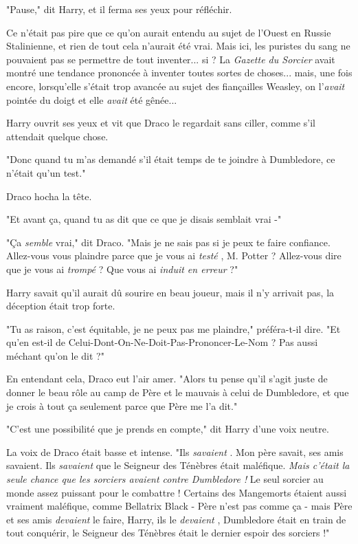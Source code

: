 "Pause," dit Harry, et il ferma ses yeux pour réfléchir.

Ce n'était pas pire que ce qu'on aurait entendu au sujet de l'Ouest en Russie Stalinienne, et rien de tout cela n'aurait été vrai. Mais ici, les puristes du sang ne pouvaient pas se permettre de tout inventer... si ? La \emph{Gazette du Sorcier}  avait montré une tendance prononcée à inventer toutes sortes de choses... mais, une fois encore, lorsqu'elle s'était trop avancée au sujet des fiançailles Weasley, on l'\emph{avait}  pointée du doigt et elle \emph{avait}  été gênée...

Harry ouvrit ses yeux et vit que Draco le regardait sans ciller, comme s'il attendait quelque chose.

"Donc quand tu m'as demandé s'il était temps de te joindre à Dumbledore, ce n'était qu'un test."

Draco hocha la tête.

"Et avant ça, quand tu as dit que ce que je disais semblait vrai -"

"Ça \emph{semble } vrai," dit Draco. "Mais je ne sais pas si je peux te faire confiance. Allez-vous vous plaindre parce que je vous ai \emph{testé} , M. Potter ? Allez-vous dire que je vous ai \emph{trompé}  ? Que vous ai \emph{induit en erreur } ?"

Harry savait qu'il aurait dû sourire en beau joueur, mais il n'y arrivait pas, la déception était trop forte.

"Tu as raison, c'est équitable, je ne peux pas me plaindre," préféra-t-il dire. "Et qu'en est-il de Celui-Dont-On-Ne-Doit-Pas-Prononcer-Le-Nom ? Pas aussi méchant qu'on le dit ?"

En entendant cela, Draco eut l'air amer. "Alors tu pense qu'il s'agit juste de donner le beau rôle au camp de Père et le mauvais à celui de Dumbledore, et que je crois à tout ça seulement parce que Père me l'a dit."

"C'est une possibilité que je prends en compte," dit Harry d'une voix neutre.

La voix de Draco était basse et intense. "Ils \emph{savaient} . Mon père savait, ses amis savaient. Ils \emph{savaient}  que le Seigneur des Ténèbres était maléfique. \emph{Mais c'était la seule chance que les sorciers avaient contre Dumbledore ! } Le seul sorcier au monde assez puissant pour le combattre ! Certains des Mangemorts étaient aussi vraiment maléfique, comme Bellatrix Black - Père n'est pas comme ça - mais Père et ses amis \emph{devaient}  le faire, Harry, ils le \emph{devaient} , Dumbledore était en train de tout conquérir, le Seigneur des Ténèbres était le dernier espoir des sorciers !"

